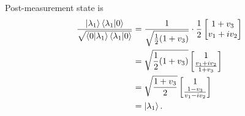 Post-measurement state is
\begin{align*}
	\frac{\ket{\lambda_1} \braket{\lambda_1 | 0}}{ \sqrt{\braket{0 | \lambda_1} \braket{\lambda_1 | 0}} } &= \frac{1}{\sqrt{\frac{1}{2} (1 + v_3)}}
	\cdot \frac{1}{2}
	\begin{bmatrix}
		1 + v_3 \\ 
		v_1 + iv_2
	\end{bmatrix} \\
		&= \sqrt{ \frac{1}{2}  (1 + v_3) } \begin{bmatrix}
		1 \\ 
		\frac{v_1 + iv_2}{1+v_3}
		\end{bmatrix} \\
		&=  \sqrt{ \frac{1 + v_3}{2} } \begin{bmatrix}
		1 \\ 
		\frac{1 - v_3}{v_1 - iv_2}
		\end{bmatrix} \\
		&= \ket{\lambda_1}.
\end{align*}


